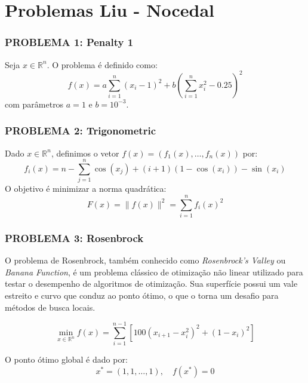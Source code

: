 \documentclass[12pt,a4paper]{article}
\begin{document}
\newpage
\pagestyle{plain} %
\tableofcontents


\newpage
{\Large\section{Problemas Liu - Nocedal}}

\subsubsection{\textbf{PROBLEMA 1: Penalty 1}}

Seja $x \in \mathbb{R}^n$. O problema é definido como:
\begin{equation}
f(x) = a \sum_{i=1}^n (x_i - 1)^2 + b\left(\sum_{i=1}^n x_i^2 - 0.25\right)^2
\end{equation}
com parâmetros $a = 1$ e $b = 10^{-3}$.


\subsubsection{\textbf{PROBLEMA 2: Trigonometric}}

Dado $x \in \mathbb{R}^n$, definimos o vetor $f(x) = (f_1(x), \dots, f_n(x))$ por:
\begin{equation}
f_i(x) = n - \sum_{j=1}^n \cos(x_j) + (i+1)(1 - \cos(x_i)) - \sin(x_i)
\end{equation}
O objetivo é minimizar a norma quadrática:
\begin{equation}
F(x) = \| f(x) \|^2 = \sum_{i=1}^n f_i(x)^2
\end{equation}

\subsubsection{\textbf{PROBLEMA 3: Rosenbrock}}


O problema de Rosenbrock, também conhecido como \textit{Rosenbrock's Valley} ou \textit{Banana Function}, é um problema clássico de otimização não linear utilizado para testar o desempenho de algoritmos de otimização. Sua superfície possui um vale estreito e curvo que conduz ao ponto ótimo, o que o torna um desafio para métodos de busca locais.

\begin{equation}
    \min_{x \in \mathbb{R}^n} f(x) = \sum_{i=1}^{n-1} \left[ 100(x_{i+1} - x_i^2)^2 + (1 - x_i)^2 \right]
\end{equation}

O ponto ótimo global é dado por:
\begin{equation}
    x^* = (1, 1, \ldots, 1), \quad f(x^*) = 0
\end{equation}
\end{document}
